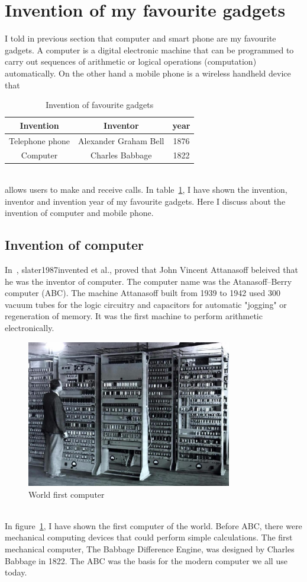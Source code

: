 \section{Invention of my favourite gadgets}
I told in previous section that computer and smart phone are my favourite gadgets. A computer is a digital electronic machine that can be programmed to carry out sequences of arithmetic or logical operations (computation) automatically. On the other hand a mobile phone is a wireless handheld device that 
\begin{table}[h]
    \centering
    \begin{tabular}{|c|c|c|}
    \hline
     Invention & Inventor & year  \\
     \hline
    Telephone phone &  Alexander Graham Bell & 1876\\
    \hline
    Computer & Charles Babbage & 1822\\
    \hline
    \end{tabular}
    \caption{Invention of favourite gadgets}
    \label{tab:my_label}
\end{table}\\
 allows users to make and receive calls. In table~\ref{tab:my_label}, I have shown the invention, inventor and invention year of my favourite gadgets. Here I discuss about the invention of computer and mobile phone.
\subsection{Invention of computer}
In~\cite{slater1987invented}, slater1987invented et al., proved that John Vincent Attanasoff beleived that he was the inventor of computer. The computer name was the Atanasoff–Berry computer (ABC). The machine Attanasoff built from 1939 to 1942 used 300 vacuum tubes for the logic circuitry and capacitors for automatic "jogging" or regeneration of memory. It was the first machine to perform arithmetic electronically. 
\begin{figure}[h]
    \centering
    \includegraphics[width = 0.8\textwidth]{pic/first_computer.jpeg}
    \caption{World first computer}
    \label{fig:fig4}
\end{figure}\\
In figure~\ref{fig:fig4}, I have shown the first computer of the world. Before ABC, there were mechanical computing devices that could perform simple calculations. The first mechanical computer, The Babbage Difference Engine, was designed by Charles Babbage in 1822. The ABC was the basis for the modern computer we all use today.
